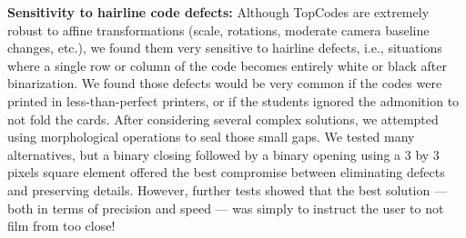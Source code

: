 
\textbf{Sensitivity to hairline code defects:} Although TopCodes are extremely robust to affine transformations (scale, rotations, moderate camera baseline changes, etc.), we found them very sensitive to hairline defects, i.e., situations where a single row or column of the code becomes entirely white or black after binarization. We found those defects would be very common if the codes were printed in less-than-perfect printers, or if the students ignored the admonition to not fold the cards. After considering several complex solutions, we attempted using morphological operations to seal those small gaps. We tested many alternatives, but a binary closing followed by a binary opening using a 3 by 3 pixels square element offered the best compromise between eliminating defects and preserving details. However, further tests showed that the best solution --- both in terms of precision and speed --- was simply to instruct the user to not film from too close!






